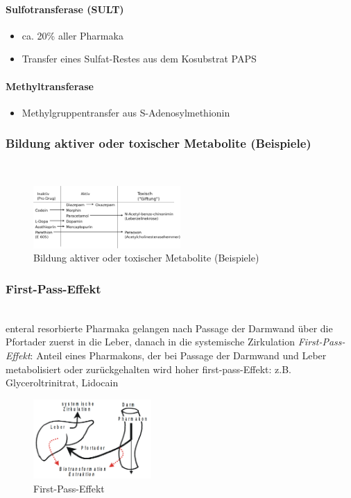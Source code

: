 \documentclass[10pt,a4paper]{report}
\begin{document}
\paragraph{Sulfotransferase (SULT)}
\begin{itemize}
	\item ca. 20\% aller Pharmaka
	\item Transfer eines Sulfat-Restes aus 
	dem Kosubstrat PAPS
\end{itemize}
\paragraph{Methyltransferase}
\begin{itemize}
	\item Methylgruppentransfer aus S-Adenosylmethionin
\end{itemize}
\subsubsection{Bildung aktiver oder toxischer Metabolite (Beispiele)} \mbox{} \\
\begin{figure}[h]
	\centering 
	\includegraphics[width=0.5\textwidth]{Pharmakodynamik.png} 
	\caption{Bildung aktiver oder toxischer Metabolite (Beispiele)} 
	\label{fig:Metabolite}
\end{figure}
\subsubsection{First-Pass-Effekt} \mbox{} \\
enteral resorbierte Pharmaka gelangen nach Passage der Darmwand über die Pfortader zuerst in die Leber, danach in die systemische Zirkulation \textit{First-Pass-Effekt}: Anteil eines Pharmakons, der bei Passage der Darmwand und Leber metabolisiert 
oder zurückgehalten wird hoher first-pass-Effekt: z.B. Glyceroltrinitrat, Lidocain
\begin{figure}[h]
	\centering 
	\includegraphics[width=0.4\textwidth]{firstpass.png} 
	\caption{First-Pass-Effekt} 
	\label{fig:FirstPass}
\end{figure}
\end{document}
